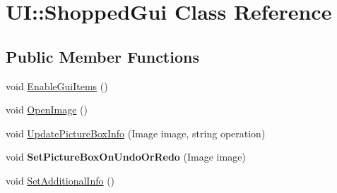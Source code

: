 \hypertarget{class_u_i_1_1_shopped_gui}{
\section{UI::ShoppedGui Class Reference}
\label{class_u_i_1_1_shopped_gui}
}
\subsection*{Public Member Functions}
\begin{DoxyCompactItemize}
\item 
void \hyperlink{class_u_i_1_1_shopped_gui_a190bba777e57891c8042b86afbba83c6}{EnableGuiItems} ()
\item 
void \hyperlink{class_u_i_1_1_shopped_gui_a3a27f074b7b204b1df148921a0dcc20c}{OpenImage} ()
\item 
void \hyperlink{class_u_i_1_1_shopped_gui_a7e94e570fc92b635f64b1e540c2c86cd}{UpdatePictureBoxInfo} (Image image, string operation)
\item 
\hypertarget{class_u_i_1_1_shopped_gui_a9771176182b68022bc433aba6e42395f}{
void {\bfseries SetPictureBoxOnUndoOrRedo} (Image image)}
\label{class_u_i_1_1_shopped_gui_a9771176182b68022bc433aba6e42395f}

\item 
void \hyperlink{class_u_i_1_1_shopped_gui_a292a827437d7f2098c13bc1a735a569e}{SetAdditionalInfo} ()
\end{DoxyCompactItemize}

